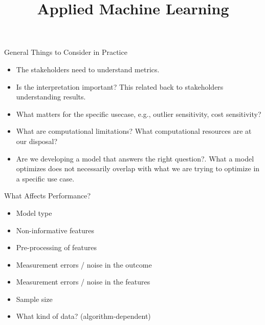 \documentclass[11pt,compress,t,notes=noshow, aspectratio=169, xcolor=table]{beamer}
\title{Applied Machine Learning}
\date{}
\begin{document}
\newcommand{\titlefigure}{figure/performance_vs_interpretability}
\newcommand{\learninggoals}{
\item What to watch out for in practice
\item Pros and cons of performance metrics
\item Advanced evaluation practices}



\begin{frame}{General Things to Consider in Practice}

\begin{itemize}
\setlength\itemsep{2em}
    \item The stakeholders need to understand metrics. 
    \item Is the interpretation important? This related back to stakeholders understanding results.
    \item What matters for the specific usecase, e.g., outlier sensitivity, cost sensitivity?
    \item What are computational limitations? What computational resources are at our disposal?
    \item Are we developing a model that answers the right question?. What a model optimizes does not necessarily overlap with what we are trying to optimize in a specific use case.
\end{itemize}
\end{frame}

\begin{frame}{What Affects Performance?}

\begin{itemize}

\setlength\itemsep{2em}
    \item Model type
    \item Non-informative features
    \item Pre-processing of features
    \item Measurement errors / noise in the outcome
    \item Measurement errors / noise in the features
    \item Sample size
    \item What kind of data? (algorithm-dependent)
\end{itemize}
\end{frame}
\end{document}
